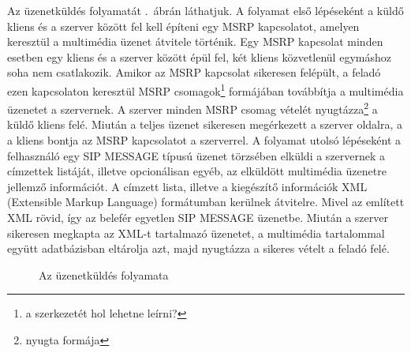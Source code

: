 Az üzenetküldés folyamatát .~ábrán láthatjuk. A folyamat első lépéseként a küldő kliens és a szerver között fel kell építeni egy MSRP kapcsolatot, amelyen keresztül a multimédia üzenet átvitele történik. Egy MSRP kapcsolat minden esetben egy kliens és a szerver között épül fel, két kliens közvetlenül egymáshoz soha nem csatlakozik. Amikor az MSRP kapcsolat sikeresen felépült, a feladó ezen kapcsolaton keresztül MSRP csomagok\footnote{a szerkezetét hol lehetne leírni?} formájában továbbítja a multimédia üzenetet a szervernek. A szerver minden MSRP csomag vételét nyugtázza\footnote{nyugta formája} a küldő kliens felé. Miután a teljes üzenet sikeresen megérkezett a szerver oldalra, a a kliens bontja az MSRP kapcsolatot a szerverrel. A folyamat utolsó lépéseként a felhasználó egy SIP MESSAGE típusú üzenet törzsében elküldi a szervernek a címzettek listáját, illetve opcionálisan egyéb, az elküldött multimédia üzenetre jellemző információt. A címzett lista, illetve a kiegészítő információk XML (Extensible Markup Language) formátumban kerülnek átvitelre. Mivel az említett XML rövid, így az belefér egyetlen SIP MESSAGE üzenetbe. Miután a szerver sikeresen megkapta az XML-t tartalmazó üzenetet, a multimédia tartalommal együtt adatbázisban eltárolja azt, majd nyugtázza a sikeres vételt a feladó felé.

\begin{figure}[htbp]
\center
{}
\caption{Az üzenetküldés folyamata}
\label{fig:sending_proc}
\end{figure}

